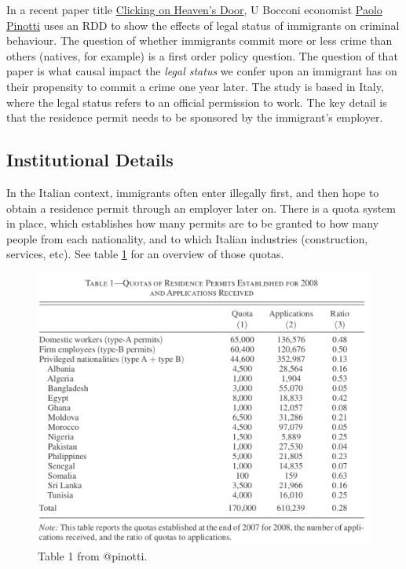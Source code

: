 \documentclass[]{book}
\begin{document}
In a recent paper title
\href{https://www.aeaweb.org/articles?id=10.1257/aer.20150355}{Clicking
on Heaven's Door}, U Bocconi economist
\href{https://sites.google.com/view/paolo-pinotti/home}{Paolo Pinotti}
uses an RDD to show the effects of legal status of immigrants on
criminal behaviour. The question of whether immigrants commit more or
less crime than others (natives, for example) is a first order policy
question. The question of that paper is what causal impact the
\emph{legal status} we confer upon an immigrant has on their propensity
to commit a crime one year later. The study is based in Italy, where the
legal status refers to an official permission to work. The key detail is
that the residence permit needs to be sponsored by the immigrant's
employer.

\subsection{Institutional Details}\label{institutional-details}

In the Italian context, immigrants often enter illegally first, and then
hope to obtain a residence permit through an employer later on. There is
a quota system in place, which establishes how many permits are to be
granted to how many people from each nationality, and to which Italian
industries (construction, services, etc). See table \ref{fig:pin1} for
an overview of those quotas.

\begin{figure}

{\centering \includegraphics[width=16.14in]{images/pinotti1} 

}

\caption{Table 1 from @pinotti.}\label{fig:pin1}
\end{figure}
\end{document}
